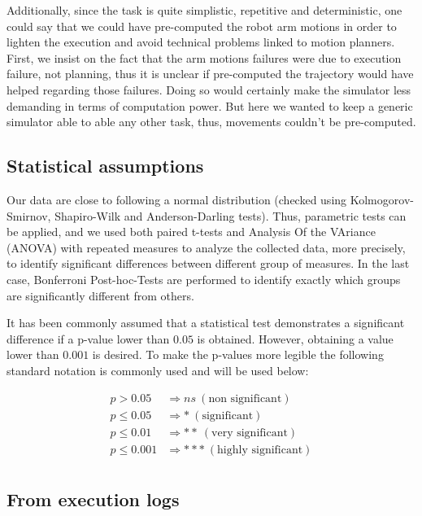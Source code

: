 Additionally, since the task is quite simplistic, repetitive and deterministic, one could say that we could have pre-computed the robot arm motions in order to lighten the execution and avoid technical problems linked to motion planners. First, we insist on the fact that the arm motions failures were due to execution failure, not planning, thus it is unclear if pre-computed the trajectory would have helped regarding those failures. Doing so would certainly make the simulator less demanding in terms of computation power. But here we wanted to keep a generic simulator able to able any other task, thus, movements couldn't be pre-computed.

\subsection{Statistical assumptions}

Our data are close to following a normal distribution (checked using Kolmogorov-Smirnov, Shapiro-Wilk and Anderson-Darling tests). Thus, parametric tests can be applied, and we used both paired t-tests and Analysis Of the VAriance (ANOVA) with repeated measures to analyze the collected data, more precisely, to identify significant differences between different group of measures. 
In the last case, Bonferroni Post-hoc-Tests are performed to identify exactly which groups are significantly different from others.

It has been commonly assumed that a statistical test demonstrates a significant difference if a p-value lower than $0.05$ is obtained. However, obtaining a value lower than $0.001$ is desired. To make the p-values more legible the following standard notation is commonly used and will be used below:

\begin{align*}
    p > 0.05        & \Rightarrow ns ~ (\textrm{non significant})\\
    p \leq 0.05     & \Rightarrow * ~ (\textrm{significant})\\
    p \leq 0.01     & \Rightarrow ** ~ (\textrm{very significant})\\
    p \leq 0.001    & \Rightarrow *** ~ (\textrm{highly significant})\\
\end{align*}


\subsection{From execution logs}

